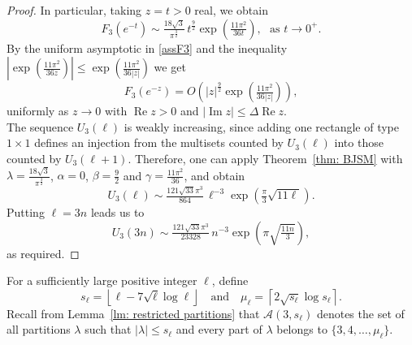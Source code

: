 \documentclass[12pt,a4paper]{amsart}
\numberwithin{equation}{section}
\theoremstyle{plain}
\theoremstyle{definition}
\theoremstyle{remark}
\begin{document}
\begin{proof}
In particular, taking $z=t>0$ real, we obtain
$$
F_3(e^{-t})
\sim
\tfrac{18\sqrt3}{\pi^{\frac{3}{2}}}\,
t^{\frac{9}{2}}
\exp\left(
\tfrac{11\pi^2}{36t}
\right),
\ \ \ \text{as }t\to0^+.
$$
By the uniform asymptotic in \eqref{assF3} and the inequality
$
|\exp(\tfrac{11\pi^2}{36z})|
\le
\exp(\tfrac{11\pi^2}{36|z|})
$
we get
$$
F_3(e^{-z})
=
O\left(
|z|^{\frac{9}{2}}
\exp\left(
\tfrac{11\pi^2}{36|z|}
\right)
\right),
$$
uniformly as $z\to 0$ with $\operatorname{Re}z>0$ and
$|\operatorname{Im}z|\le \Delta\operatorname{Re}z$.\\
The sequence $U_3(\ell)$ is weakly increasing, since adding one rectangle of type $1\times1$ defines an injection from the multisets counted by $U_3(\ell)$ into those counted by $U_3(\ell+1)$. Therefore, one can apply Theorem~\ref{thm: BJSM}  with $\lambda=\tfrac{18\sqrt3}{\pi^{\frac{3}{2}}}$, $\alpha=0$, $\beta=\tfrac92$ and $\gamma=\tfrac{11\pi^2}{36}$, and obtain
$$
U_3(\ell)
\sim
\tfrac{121\sqrt{33}\pi^3}{864}\,
\ell^{-3}
\exp\left(
\tfrac{\pi}{3}\sqrt{11\ell}
\right).
$$
Putting $\ell=3n$ leads us to
$$
U_3(3n)
\sim
\tfrac{121\sqrt{33}\pi^3}{23328}\,
n^{-3}
\exp\left(
\pi\sqrt{\tfrac{11n}{3}}
\right),
$$
as required.
\end{proof}
For a sufficiently large positive integer $\ell$, define
\begin{equation}\label{sellmiell}
s_\ell=\left\lfloor \ell-7\sqrt\ell\log\ell\right\rfloor
\quad\text{and}\quad
\mu_\ell=\left\lceil2\sqrt{s_\ell}\log s_\ell\right\rceil.
\end{equation}
Recall from Lemma~\ref{lm: restricted partitions} that
$\mathcal A(3,s_\ell)$ denotes the set of all partitions $\lambda$ such that
$|\lambda|\le s_\ell$ and every part of $\lambda$ belongs to
$\{3,4,\ldots,\mu_\ell\}$.
\end{document}
